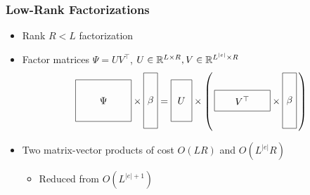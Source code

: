 \documentclass{beamer}
\begin{document}
\begin{frame}
\frametitle{Low-Rank Factorizations}
\begin{itemize}
\item Rank $R < L$ factorization
\vspace{1em}
\item Factor matrices $\Psi=UV^\top$,
$U\in\mathbb{R}^{L \times R},V\in\mathbb{R}^{L^{|e|}\times R}$
\[
\vcenter{\hbox{\begin{tikzpicture}[baseline=-0.5ex]
    \draw (0,0) rectangle (2,1.5) node[pos=.5] {$\Psi$};
\end{tikzpicture}}}
\times
\vcenter{\hbox{\begin{tikzpicture}[baseline=-0.5ex]
    \draw (0,0) rectangle (.5,2) node[pos=.5] {$\beta$};
\end{tikzpicture}}}
=
\vcenter{\hbox{\begin{tikzpicture}[baseline=-0.5ex]
    \draw (0,0) rectangle (.75,1.5) node[pos=.5] {$U$};
\end{tikzpicture}}}
\times
\left(\,
\vcenter{\hbox{\begin{tikzpicture}[baseline=-0.5ex]
    \draw (0,0) rectangle (2,.75) node[pos=.5] {$V^\top$};
\end{tikzpicture}}}
\times
\vcenter{\hbox{\begin{tikzpicture}[baseline=-0.5ex]
    \draw (0,0) rectangle (.5,2) node[pos=.5] {$\beta$};
\end{tikzpicture}}}
\,\right)
\]
\item Two matrix-vector products of cost $O(LR)$ and $O(L^{|e|}R)$
    \begin{itemize}
    \item Reduced from $O(L^{|e|+1})$
    \end{itemize}
\end{itemize}
\end{frame}
\end{document}
